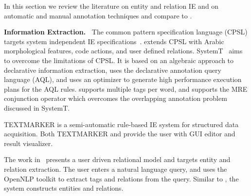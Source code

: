 In this section we review the literature on entity and relation IE 
and on automatic and manual annotation techniques 
and compare to \framework.


{\bf Information Extraction.~}
The common pattern specification language (CPSL) targets system independent IE specifications~\cite{appelt1998common}. 
\framework extends CPSL with Arabic morphological features, code actions, and user defined relations.
SystemT~\cite{chiticariu2010systemt} aims to overcome the 
limitations of CPSL. 
It is based on an algebraic approach to declarative information extraction, 
uses the declarative annotation query language (AQL), 
and uses an optimizer to generate high performance execution plans for the AQL rules.
\framework supports multiple tags per word, and supports the MRE conjunction operator which overcomes the overlapping annotation problem discussed in SystemT.

TEXTMARKER is a semi-automatic rule-based IE system 
for structured data acquisition\cite{atzmueller2008rule}.
Both TEXTMARKER and \framework provide the user with GUI editor and result visualizer.

The work in~\cite{urbain2012user} presents a user 
driven relational model and targets entity and relation extraction. 
The user enters a natural language query, and uses the OpenNLP toolkit to 
extract tags and relations from the query. 
Similar to \framework, the system constructs entities and relations. 

